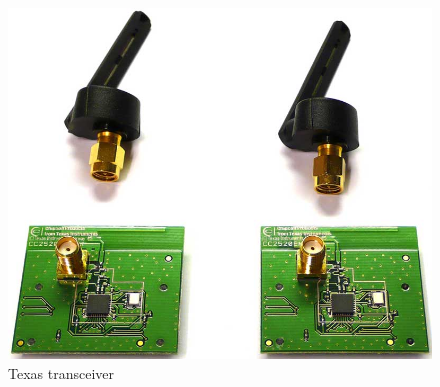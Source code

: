 \begin{figure}[ht]
	\centering
	\includegraphics[scale=0.3]{images/texas.jpg}
	\caption{Texas transceiver}
\end{figure}
